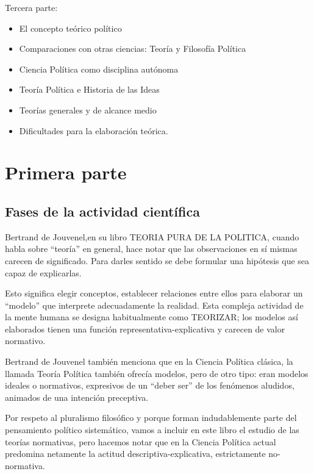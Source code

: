\documentclass[
]{book}
\providecommand{\tightlist}{%
  \setlength{\itemsep}{0pt}\setlength{\parskip}{0pt}}
\begin{document}
Tercera parte:

\begin{itemize}
\tightlist
\item
  El concepto teórico político
\item
  Comparaciones con otras ciencias: Teoría y Filosofía Política
\item
  Ciencia Política como disciplina autónoma
\item
  Teoría Política e Historia de las Ideas
\item
  Teorías generales y de alcance medio
\item
  Dificultades para la elaboración teórica.
\end{itemize}

\hypertarget{primera-parte}{%
\section*{Primera parte}\label{primera-parte}}

\hypertarget{fases-de-la-actividad-cientuxedfica}{%
\subsection*{Fases de la actividad científica}\label{fases-de-la-actividad-cientuxedfica}}

Bertrand de Jouvenel,en su libro TEORIA PURA DE LA POLITICA, cuando habla sobre ``teoría'' en general, hace notar que las observaciones en sí mismas carecen de significado. Para darles sentido se debe formular una hipótesis que sea capaz de explicarlas.

Esto significa elegir conceptos, establecer relaciones entre ellos para elaborar un ``modelo'' que interprete adecuadamente la realidad. Esta compleja actividad de la mente humana se designa habitualmente como TEORIZAR; los modelos así elaborados tienen una función representativa-explicativa y carecen de valor normativo.

Bertrand de Jouvenel también menciona que en la Ciencia Política clásica, la llamada Teoría Política también ofrecía modelos, pero de otro tipo: eran modelos ideales o normativos, expresivos de un ``deber ser'' de los fenómenos aludidos, animados de una intención preceptiva.

Por respeto al pluralismo filosófico y porque forman indudablemente parte del pensamiento político sistemático, vamos a incluir en este libro el estudio de las teorías normativas, pero hacemos notar que en la Ciencia Política actual predomina netamente la actitud descriptiva-explicativa, estrictamente no-normativa.
\end{document}
